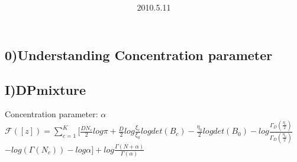 \documentclass{article}
\title{\vspace{0.3in}\textmd{\textbf{\hmwkTitle}}}
\date{2010.5.11}
\author{\textbf{\hmwkAuthorName}}
\begin{document}
\begin{spacing}{1.1}
\maketitle

\section{0)Understanding Concentration parameter}
\subsection{I)DPmixture}
Concentration parameter: $\alpha$ \\
$\mathcal{F}([z])=\sum_{c=1}^{K}[\frac{DN_{c}}{2}log\pi+\frac{D}{2}log\frac{\xi_{c}}{\xi_{0}}log det(B_{c})
-\frac{\eta_{0}}{2}log det(B_{0})-log \frac{\Gamma_{D}(\frac{\eta_{c}}{2})}{\Gamma_{D}(\frac{\eta_{0}}{2})}$
\underline{ $ -log(\Gamma(N_{c}))-log \alpha]+log \frac{\Gamma(N+\alpha)}{\Gamma(\alpha)}$}\\ \\

\end{spacing}
\end{document}
